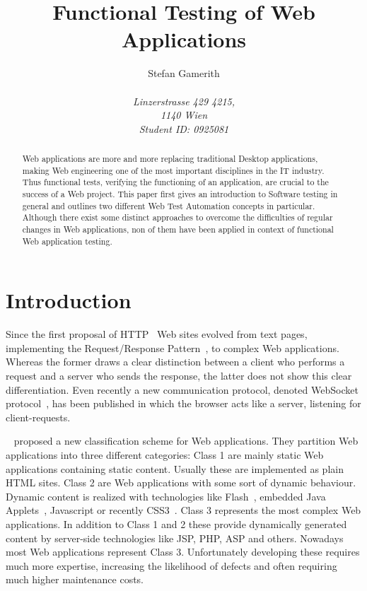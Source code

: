 \documentclass[12pt, notitlepage]{article}
\title{Functional Testing of Web Applications}
\author{Stefan Gamerith\\\\
		\emph{Linzerstrasse 429 4215,}\\
		\emph{1140 Wien}\\
		\emph{Student ID: 0925081}}
\begin{document}
	\maketitle
	\thispagestyle{empty}
	\begin{abstract}
		Web applications are more and more replacing traditional Desktop applications, making Web engineering one of the
		most important disciplines in the IT industry. Thus functional tests, verifying the functioning of an application, are
		crucial to the success of a Web project. This paper first gives an introduction to Software testing in general and
		outlines two different Web Test Automation concepts in particular. Although there exist some distinct approaches 
		to overcome the difficulties of regular changes in Web applications, non of them have been applied in context of 
		functional Web application testing.   
	\end{abstract}
	\newpage
	\onehalfspacing
	\tableofcontents
	\thispagestyle{empty}
	\singlespacing
\newpage
\setcounter{page}{1}

\section*{Introduction}
Since the first proposal of HTTP~\cite{http-proposal} Web sites evolved from 
text pages, implementing the Request/Response Pattern~\cite{request-response}, to  
complex Web applications. Whereas the former draws a clear distinction between a client
who performs a request and a server who sends the response, the latter does not show this 
clear differentiation. Even recently a new communication protocol, denoted WebSocket protocol~\cite{web-socket}, has been published 
in which the browser acts like a server, listening for client-requests.

~\citet{web-classification} proposed
a new classification scheme for Web applications. They partition Web applications into three different categories:
Class 1 are mainly static Web applications containing static content. Usually these are implemented as plain HTML sites. 
Class 2 are Web applications with some sort of dynamic behaviour. Dynamic content is realized with technologies like Flash~\cite{flash},
embedded Java Applets~\cite{java-applet}, Javascript or recently CSS3~\cite{css3}. 
Class 3 represents the most complex Web applications. In addition to Class 1 and 2 these provide dynamically generated content by server-side technologies
like JSP, PHP, ASP and others. Nowadays most Web applications represent Class 3. Unfortunately developing these requires much more expertise, increasing the
likelihood of defects and often requiring much higher maintenance costs.
\end{document}
